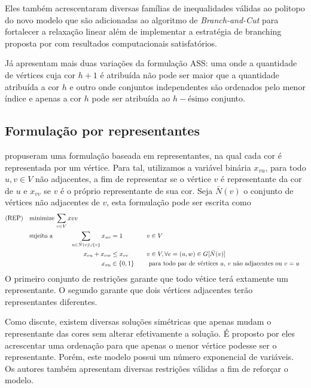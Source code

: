 \documentclass[11pt]{article}
\begin{document}
Eles também acrescentaram diversas famílias de inequalidades válidas ao politopo do novo modelo que são adicionadas ao algoritmo de \emph{Branch-and-Cut}  para fortalecer a relaxação linear além de implementar a estratégia de branching proposta por \textcite{Brelaz1979Newmethodscolor} com resultados computacionais satisfatórios.

Já \textcite{MendezDiaz2008CuttingPlaneAlgorithm} apresentam mais duas variações da formulação ASS: uma onde a quantidade de vértices cuja cor \(h+1\) é atribuída não pode ser maior que a quantidade atribuída a cor \(h\) e outro onde conjuntos independentes são ordenados pelo menor índice e apenas a cor \(h\) pode ser atribuída ao \(h-\text{ésimo}\) conjunto.

\subsection{Formulação por representantes}
\label{sec:org00de8d5}
\autocite{Campelo2004CliquesHolesVertex} propuseram uma formulação baseada em representantes, na qual cada cor é representada por um vértice.
Para tal, utilizamos a variável binária \(x_{vu}\), para todo \(u, v \in V\) não adjacentes, a fim de representar se o vértice \(v\) é representante da cor de \(u\) e \(x_{vv}\) se \(v\) é o próprio representante de sua cor.
Seja \(\bar{N}(v)\) o conjunto de vértices não adjacentes de \(v\), esta formulação pode ser escrita como
\begin{alignat*}{4}
\mathrm{(REP)} \quad & \omit\rlap{minimize  $\displaystyle \sum_{v \in V} x{vv}$} \\
& \mbox{sujeito a}&& \quad & \sum_{u \in \bar{N}(v) \cup \{v\}} x_{uv}&= 1        & \quad & v \in V \\
&                 &&   & x_{vu} + x_{vw}    & \leq x_{vv} &   & v \in V, \forall e = (u,w) \in G[\bar{N}(v)] \\
&                 &&   & x_{vu}       & \in \{0,1\} &   & \text{ para todo par de vértices $u$, $v$ não adjacentes ou $v = u$}
\end{alignat*}
O primeiro conjunto de restrições garante que todo vétice terá extamente um representante.
O segundo garante que dois vértices adjacentes terão representantes diferentes.

Como \autocite{Campelo2008AsymmetricRepresentativesFormulation} discute, existem diversas soluções simétricas que apenas mudam o representante das cores sem alterar efetivamente a solução.
É proposto por eles acrescentar uma ordenação para que apenas o menor vértice podesse ser o representante.
Porém, este modelo possui um número exponencial de variáveis.
Os autores também apresentam diversas restrições válidas a fim de reforçar o modelo.
\end{document}
